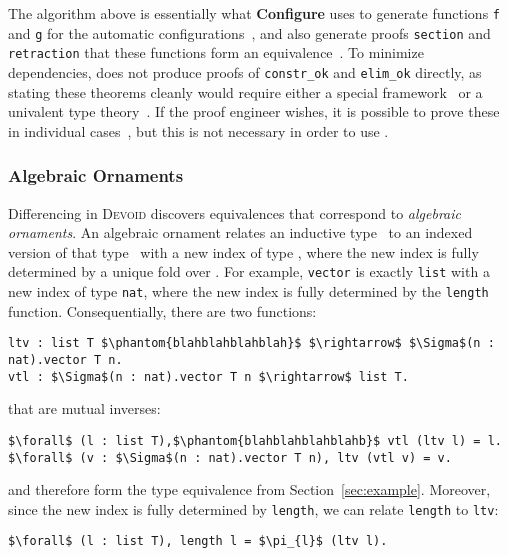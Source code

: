 The algorithm above is essentially what \textbf{Configure} uses to generate functions \lstinline{f} and \lstinline{g} for the automatic configurations~\href{https://github.com/uwplse/pumpkin-pi/blob/v2.0.0/plugin/src/automation/search/search.ml}{}, %
and also generate proofs \lstinline{section} and \lstinline{retraction} that these functions form an equivalence~\href{https://github.com/uwplse/pumpkin-pi/blob/v2.0.0/plugin/src/automation/search/equivalence.ml}{}. %
To minimize dependencies, \toolnamec does not produce proofs of \lstinline{constr_ok} and \lstinline{elim_ok} directly,
as stating these theorems cleanly would require either a special framework~\cite{tabareau2017equivalences}
or a univalent type theory~\cite{univalent2013homotopy}.
If the proof engineer wishes, it is possible to prove these in individual cases~\href{https://github.com/uwplse/pumpkin-pi/blob/v2.0.0/plugin/coq/playground/arbitrary.v}{}, %
but this is not necessary in order to use \toolnamec. %


\subsubsection{Algebraic Ornaments}

Differencing in \textsc{Devoid} discovers equivalences that correspond to \textit{algebraic ornaments}.
An algebraic ornament relates an inductive type \Aa\ to an indexed version of that type \B\ with a new index of type \IB,
where the new index is fully determined by a unique fold over \Aa. 
For example, \lstinline{vector} is exactly \lstinline{list} with a new index of type \lstinline{nat},
where the new index is fully determined by the \lstinline{length} function. Consequentially, there are two functions:
\begin{lstlisting}
ltv : list T $\phantom{blahblahblahblah}$ $\rightarrow$ $\Sigma$(n : nat).vector T n.
vtl : $\Sigma$(n : nat).vector T n $\rightarrow$ list T.
\end{lstlisting}
that are mutual inverses:
\begin{lstlisting}
$\forall$ (l : list T),$\phantom{blahblahblahblahb}$ vtl (ltv l) = l.
$\forall$ (v : $\Sigma$(n : nat).vector T n), ltv (vtl v) = v.
\end{lstlisting}
and therefore form the type equivalence from Section~\ref{sec:example}.
Moreover, since the new index is fully determined by \lstinline{length}, we can relate \lstinline{length} to \lstinline{ltv}:
\begin{lstlisting}
$\forall$ (l : list T), length l = $\pi_{l}$ (ltv l).
\end{lstlisting}

